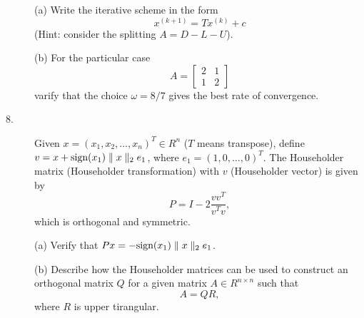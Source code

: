 \documentclass{article}
\begin{document}
\begin{description}
\item[\quad] (a)
Write the iterative scheme in the form
$$x^{(k+1)} = Tx^{(k)} + c$$
(Hint: consider the splitting $A=D-L-U$).

\item[\quad] (b)
For the particular case
$$A= \begin{bmatrix} 2&1 \\ 1&2 \end{bmatrix}$$
varify that the choice $\omega = 8/7$ gives the best rate of convergence.

\item[8.]
Given $x= (x_1, x_2, \dots, x_n)^T \in R^n$ ($T$ means transpose), define
$v = x + \hbox{sign} (x_1) \parallel x \parallel _2 e_1$, where
$e_1 = (1,0, \dots, 0)^T$. The Householder matrix (Householder
transformation) with $v$ (Householder vector) is given by
$$P=I - 2 \frac{vv^T}{v^Tv},$$
which is orthogonal and symmetric.

\item[\quad] (a)
Verify that $Px = -\hbox{sign} (x_1) \parallel x \parallel_2 e_1$.

\item[\quad] (b)
Describe how the Householder matrices can be used to construct an orthogonal
matrix $Q$ for a given matrix $A \in R^{n \times n}$ such that
$$A=QR,$$
where $R$ is upper tirangular.




\end{description}    
\end{document}
